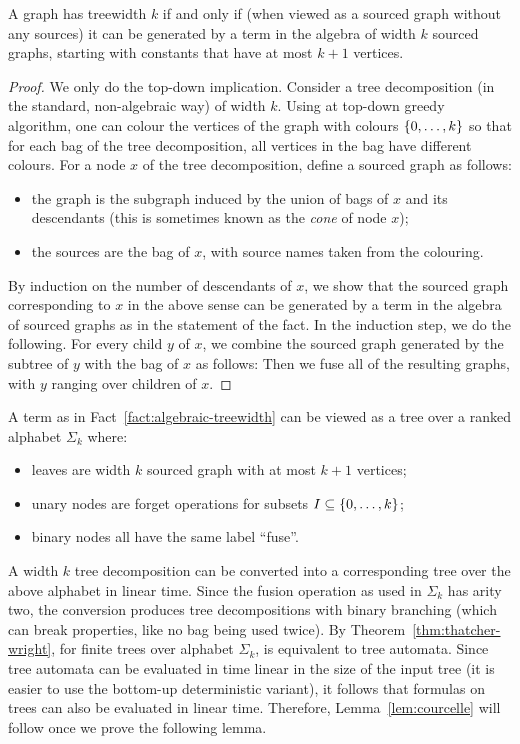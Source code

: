 \begin{fact}\label{fact:algebraic-treewidth}
A graph has treewidth $k$ if and only if  (when viewed as a sourced graph without any sources) it can be generated by a term in the  algebra of width $k$ sourced graphs, starting with  constants that have at most $k+1$ vertices.	\end{fact}

\begin{proof}
We only do the top-down implication.  Consider a tree decomposition (in the standard, non-algebraic way) of width $k$. Using at top-down greedy algorithm, one can colour the vertices of the graph with colours $\{0,\ldots,k\}$ so that for each bag of the tree decomposition, all vertices in the bag have different colours. For a node $x$ of the tree decomposition, define a sourced graph as follows:
\begin{itemize}
	\item the graph is the subgraph induced by the union of bags of $x$ and its descendants (this is sometimes known as the \emph{cone} of node $x$);
	\item the sources are the bag of $x$, with source names taken from the colouring.
\end{itemize}
By induction on the number of descendants of $x$, we show that the sourced graph corresponding to $x$ in the above sense can be generated by a term in the algebra of sourced graphs as in the statement of the fact. In the induction step, we do the following. For every child $y$ of $x$, we combine the sourced graph generated by the subtree of $y$ with the bag of $x$ as follows: 
Then we fuse all of the resulting graphs, with $y$ ranging over children of $x$.	
\end{proof}
A term as in Fact~\ref{fact:algebraic-treewidth} can be viewed as a tree over a ranked alphabet $\Sigma_k$ where:
\begin{itemize}
	\item leaves are  width $k$ sourced graph with at most $k+1$ vertices;
	\item unary nodes are forget operations for subsets $I \subseteq \{0,\ldots,k\}$;
	\item binary nodes all have the same label ``fuse''.
\end{itemize}
A width $k$ tree decomposition can be converted into a corresponding tree over the above alphabet in linear time. Since the fusion operation as used in $\Sigma_k$ has arity two, the conversion produces tree decompositions with binary branching (which can break properties, like no bag being used twice). 
By Theorem~\ref{thm:thatcher-wright}, for finite trees over alphabet $\Sigma_k$, \mso is equivalent to tree automata. Since tree automata can be evaluated in time linear in the size of the input tree (it is easier to use the bottom-up deterministic variant), it follows that \mso formulas on trees can also be evaluated in linear time. 
 Therefore, Lemma~\ref{lem:courcelle} will follow once we prove the following lemma.


